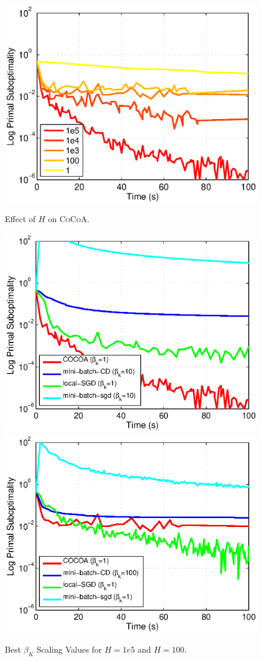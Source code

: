 \documentclass{article} %
\newcommand{\algname}{\textsc{CoCoA}\xspace}  %
\begin{document}
\begin{figure}[h!]
\begin{minipage}{.33\textwidth}
\includegraphics[width=\linewidth]{figs/Batchsize_Effect.eps}\vspace{-1mm}
\caption{\small Effect of $H$ on \algname.}
\label{fig:BatchEffect}
\end{minipage}\hfill
\begin{minipage}{.66\textwidth}
\includegraphics[width=.5\linewidth]{figs/Beta_Scaling_1.eps}
\includegraphics[width=.5\linewidth]{figs/Beta_Scaling_2.eps}\vspace{-1mm}
\caption{Best $\beta_K$ Scaling Values for $H=1e5$ and $H=100$.}
\label{fig:BetaScaling}
\end{minipage}
\end{figure}
\end{document}
